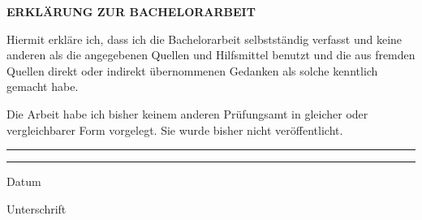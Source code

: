 
\begin{center}
    \LARGE\textbf{ERKLÄRUNG ZUR BACHELORARBEIT}
\end{center}
\vspace{1cm}

\large
Hiermit erkläre ich, dass ich die Bachelorarbeit selbstständig
verfasst und keine anderen als die angegebenen Quellen und Hilfsmittel
benutzt
und die aus fremden Quellen direkt oder indirekt übernommenen Gedanken als
solche kenntlich gemacht habe.

Die Arbeit habe ich bisher keinem anderen Prüfungsamt in gleicher oder
vergleichbarer Form vorgelegt. Sie wurde bisher nicht veröffentlicht.

\vspace{0.1\paperheight}

\rule{0.45\textwidth}{1pt}
\hfill
\rule{0.45\textwidth}{1pt}


\normalsize
\begin{center}
    \begin{minipage}[h]{0.45\textwidth}
        Datum
    \end{minipage}
    \hfill
    \begin{minipage}[h]{0.45\textwidth}
        Unterschrift
    \end{minipage}
\end{center}